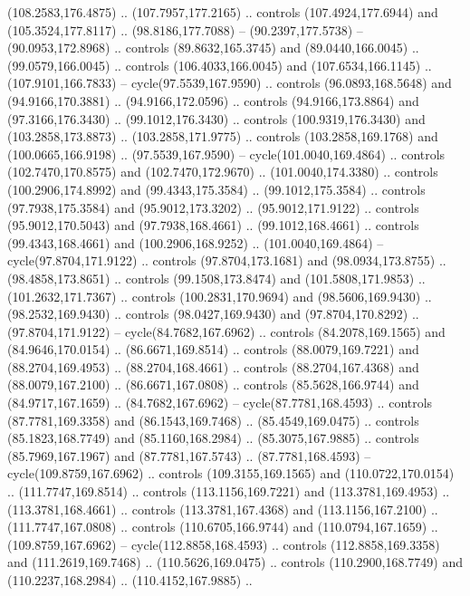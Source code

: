 \begin{scope}[cm={{1.25,0.0,0.0,-1.25,(0.0,442.91375)}}]
    (108.2583,176.4875) .. (107.7957,177.2165) .. controls (107.4924,177.6944) and
    (105.3524,177.8117) .. (98.8186,177.7088) -- (90.2397,177.5738) --
    (90.0953,172.8968) .. controls (89.8632,165.3745) and (89.0440,166.0045) ..
    (99.0579,166.0045) .. controls (106.4033,166.0045) and (107.6534,166.1145) ..
    (107.9101,166.7833) -- cycle(97.5539,167.9590) .. controls (96.0893,168.5648)
    and (94.9166,170.3881) .. (94.9166,172.0596) .. controls (94.9166,173.8864)
    and (97.3166,176.3430) .. (99.1012,176.3430) .. controls (100.9319,176.3430)
    and (103.2858,173.8873) .. (103.2858,171.9775) .. controls (103.2858,169.1768)
    and (100.0665,166.9198) .. (97.5539,167.9590) -- cycle(101.0040,169.4864) ..
    controls (102.7470,170.8575) and (102.7470,172.9670) .. (101.0040,174.3380) ..
    controls (100.2906,174.8992) and (99.4343,175.3584) .. (99.1012,175.3584) ..
    controls (97.7938,175.3584) and (95.9012,173.3202) .. (95.9012,171.9122) ..
    controls (95.9012,170.5043) and (97.7938,168.4661) .. (99.1012,168.4661) ..
    controls (99.4343,168.4661) and (100.2906,168.9252) .. (101.0040,169.4864) --
    cycle(97.8704,171.9122) .. controls (97.8704,173.1681) and (98.0934,173.8755)
    .. (98.4858,173.8651) .. controls (99.1508,173.8474) and (101.5808,171.9853)
    .. (101.2632,171.7367) .. controls (100.2831,170.9694) and (98.5606,169.9430)
    .. (98.2532,169.9430) .. controls (98.0427,169.9430) and (97.8704,170.8292) ..
    (97.8704,171.9122) -- cycle(84.7682,167.6962) .. controls (84.2078,169.1565)
    and (84.9646,170.0154) .. (86.6671,169.8514) .. controls (88.0079,169.7221)
    and (88.2704,169.4953) .. (88.2704,168.4661) .. controls (88.2704,167.4368)
    and (88.0079,167.2100) .. (86.6671,167.0808) .. controls (85.5628,166.9744)
    and (84.9717,167.1659) .. (84.7682,167.6962) -- cycle(87.7781,168.4593) ..
    controls (87.7781,169.3358) and (86.1543,169.7468) .. (85.4549,169.0475) ..
    controls (85.1823,168.7749) and (85.1160,168.2984) .. (85.3075,167.9885) ..
    controls (85.7969,167.1967) and (87.7781,167.5743) .. (87.7781,168.4593) --
    cycle(109.8759,167.6962) .. controls (109.3155,169.1565) and
    (110.0722,170.0154) .. (111.7747,169.8514) .. controls (113.1156,169.7221) and
    (113.3781,169.4953) .. (113.3781,168.4661) .. controls (113.3781,167.4368) and
    (113.1156,167.2100) .. (111.7747,167.0808) .. controls (110.6705,166.9744) and
    (110.0794,167.1659) .. (109.8759,167.6962) -- cycle(112.8858,168.4593) ..
    controls (112.8858,169.3358) and (111.2619,169.7468) .. (110.5626,169.0475) ..
    controls (110.2900,168.7749) and (110.2237,168.2984) .. (110.4152,167.9885) ..

\end{scope}
